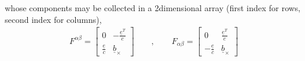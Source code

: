 \documentclass[letterpaper,10pt,english]{jupyterBook}
\begin{document}
\sphinxAtStartPar
whose components may be collected in a 2\sphinxhyphen{}dimensional array (first index for rows, second index for columns),
\begin{equation*}
\begin{split}F^{\alpha \beta} = 
\begin{bmatrix}
                        0 & -\frac{\underline{e}^T}{c} \\
  \frac{\underline{e}}{c} & \underline{b}_{\times}
\end{bmatrix}
\qquad , \qquad 
F_{\alpha \beta} = 
\begin{bmatrix}
                        0 & \frac{\underline{e}^T}{c} \\
 -\frac{\underline{e}}{c} & \underline{b}_{\times}
\end{bmatrix}
\end{split}
\end{equation*}
\end{document}
